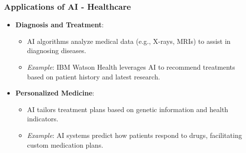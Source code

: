 \documentclass{beamer}
\begin{document}
\begin{frame}[fragile]
    \frametitle{Applications of AI - Healthcare}
    \begin{itemize}
        \item \textbf{Diagnosis and Treatment}:
        \begin{itemize}
            \item AI algorithms analyze medical data (e.g., X-rays, MRIs) to assist in diagnosing diseases.
            \item \textit{Example}: IBM Watson Health leverages AI to recommend treatments based on patient history and latest research.
        \end{itemize}
        
        \item \textbf{Personalized Medicine}:
        \begin{itemize}
            \item AI tailors treatment plans based on genetic information and health indicators.
            \item \textit{Example}: AI systems predict how patients respond to drugs, facilitating custom medication plans.
        \end{itemize}
    \end{itemize}
\end{frame}
\end{document}
